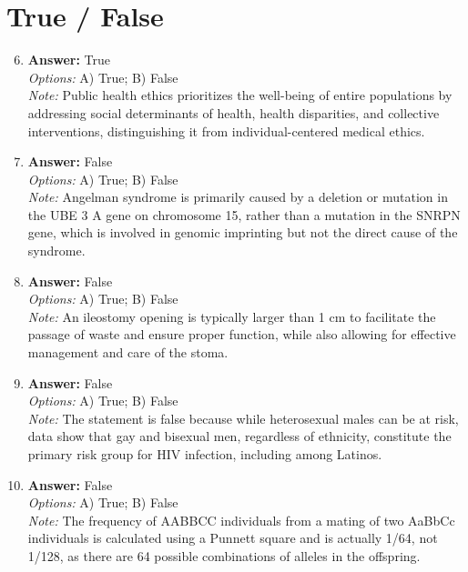 \documentclass[12pt]{article}
\begin{document}
\section*{True / False}
\begin{enumerate}[label=\arabic*.]
\setcounter{enumi}{5}
\item \textbf{Answer:} True
\\ \textit{Options:} A) True; B) False
\\ \textit{Note:} Public health ethics prioritizes the well-being of entire populations by addressing social determinants of health, health disparities, and collective interventions, distinguishing it from individual-centered medical ethics.
\item \textbf{Answer:} False
\\ \textit{Options:} A) True; B) False
\\ \textit{Note:} Angelman syndrome is primarily caused by a deletion or mutation in the UBE 3 A gene on chromosome 15, rather than a mutation in the SNRPN gene, which is involved in genomic imprinting but not the direct cause of the syndrome.
\item \textbf{Answer:} False
\\ \textit{Options:} A) True; B) False
\\ \textit{Note:} An ileostomy opening is typically larger than 1 cm to facilitate the passage of waste and ensure proper function, while also allowing for effective management and care of the stoma.
\item \textbf{Answer:} False
\\ \textit{Options:} A) True; B) False
\\ \textit{Note:} The statement is false because while heterosexual males can be at risk, data show that gay and bisexual men, regardless of ethnicity, constitute the primary risk group for HIV infection, including among Latinos.
\item \textbf{Answer:} False
\\ \textit{Options:} A) True; B) False
\\ \textit{Note:} The frequency of AABBCC individuals from a mating of two AaBbCc individuals is calculated using a Punnett square and is actually 1/64, not 1/128, as there are 64 possible combinations of alleles in the offspring.
\end{enumerate}
\end{document}
